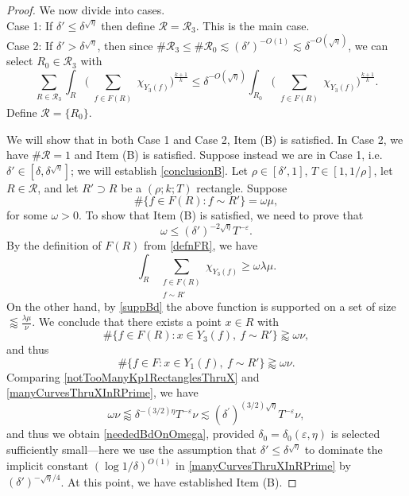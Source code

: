 \documentclass[letterpaper, reqno,11pt]{article}
\numberwithin{equation}{section}
\newcommand{\eps}{\varepsilon}
\numberwithin{thm}{section}
\theoremstyle{remark}
\begin{document}
\begin{proof}
\medskip

We now divide into cases.\\
Case 1: If $\delta'\leq\delta^{\sqrt\eta}$ then define $\mathcal{R}=\mathcal{R}_3$. This is the main case.\\
Case 2: If $\delta'>\delta^{\sqrt\eta}$, then since $\#\mathcal{R}_3\leq \#\mathcal{R}_0\lesssim (\delta')^{-O(1)}\lesssim \delta^{-O(\sqrt\eta)}$, we can select $R_0\in\mathcal{R}_3$ with
\begin{equation}\label{chain3}
\sum_{R\in\mathcal{R}_3}\int_R \Big(\sum_{\substack{f\in F(R)}}\chi_{Y_3(f)} \Big)^{\frac{k+1}{k}}\leq \delta^{-O(\sqrt\eta)}\int_{R_0}\Big(\sum_{\substack{f\in F(R)}}\chi_{Y_3(f)} \Big)^{\frac{k+1}{k}}.
\end{equation}
Define $\mathcal{R}=\{R_0\}$.

We will show that in both Case 1 and Case 2, Item (B) is satisfied. In Case 2, we have $\#\mathcal{R}=1$ and Item (B) is satisfied. Suppose instead we are in Case 1, i.e.~$\delta'\in [\delta, \delta^{\sqrt\eta}]$; we will establish \eqref{conclusionB}. Let $\rho\in [\delta', 1]$, $T\in [1,1/\rho]$, let $R\in\mathcal{R}$, and let $R'\supset R$ be a $(\rho; k; T)$ rectangle. Suppose
\[
\#\{f\in F(R)\colon f\sim R'\} = \omega\mu,
\]
for some $\omega>0$. To show that Item (B) is satisfied, we need to prove that
\begin{equation}\label{neededBdOnOmega}
\omega \leq (\delta')^{-2\sqrt\eta}T^{-\eps}. 
\end{equation}
%
By the definition of $F(R)$ from \eqref{defnFR}, we have
\[
\int_R \sum_{\substack{f\in F(R)\\ f\sim R'}}\chi_{Y_3(f)} \geq \omega\lambda\mu.
\]
On the other hand, by \eqref{suppBd} the above function is supported on a set of size $\lessapprox \frac{\lambda\mu}{\nu}$. We conclude that there exists a point $x\in R$ with
\[
\#\{f\in F(R)\colon x \in Y_3(f),\ f\sim R'\} \gtrapprox \omega \nu,
\]
and thus
\begin{equation}\label{manyCurvesThruXInRPrime}
\#\{f\in F\colon x\in Y_1(f),\ f\sim R'\} \gtrapprox \omega \nu.
\end{equation}
Comparing \eqref{notTooManyKp1RectanglesThruX} and \eqref{manyCurvesThruXInRPrime}, we have 
\[
\omega \nu \lessapprox \delta^{-(3/2)\eta}T^{-\eps}\nu \lesssim (\delta^\prime)^{(3/2)\sqrt\eta}T^{-\eps}\nu,
\]
and thus we obtain \eqref{neededBdOnOmega}, provided $\delta_0=\delta_0(\eps,\eta)$ is selected sufficiently small---here we use the assumption that $\delta'\leq \delta^{\sqrt\eta}$ to dominate the implicit constant $(\log 1/\delta)^{O(1)}$ in \eqref{manyCurvesThruXInRPrime} by $(\delta')^{-\sqrt \eta/4}$. At this point, we have established Item (B).



\end{proof}
\end{document}

